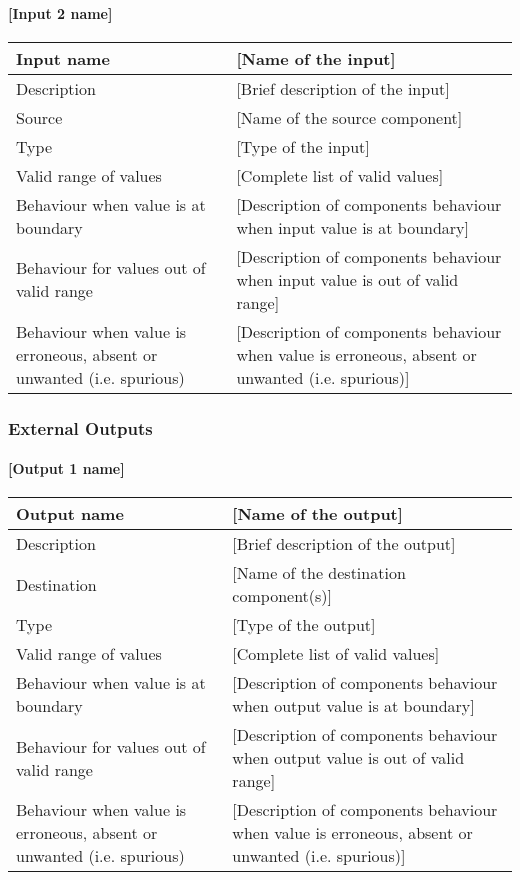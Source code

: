 \paragraph{[Input 2 name]}

\begin{longtable}{p{}p{}}
\toprule
Input name				& [Name of the input] \\
\midrule
Description				& [Brief description of the input] \\
\midrule
Source					& [Name of the source component] \\ 
\midrule
Type					& [Type of the input] \\
\midrule
Valid range of values	& [Complete list of valid values] \\
\midrule
Behaviour when value is at boundary	& [Description of components behaviour when input value is at boundary] \\
\midrule
Behaviour for values out of valid range	& [Description of components behaviour when input value is out of valid range] \\
\midrule
Behaviour when value is erroneous, absent or unwanted (i.e. spurious) & [Description of components behaviour when value is erroneous, absent or unwanted (i.e. spurious)] \\
\bottomrule
\end{longtable}


\subsubsection{External Outputs}

\paragraph{[Output 1 name]}

\begin{longtable}{p{}p{}}
\toprule
Output name				& [Name of the output] \\
\midrule
Description				& [Brief description of the output] \\
\midrule
Destination				& [Name of the destination component(s)] \\ 
\midrule
Type					& [Type of the output] \\
\midrule
Valid range of values	& [Complete list of valid values] \\
\midrule
Behaviour when value is at boundary	& [Description of components behaviour when output value is at boundary] \\
\midrule
Behaviour for values out of valid range	& [Description of components behaviour when output value is out of valid range] \\
\midrule
Behaviour when value is erroneous, absent or unwanted (i.e. spurious) & [Description of components behaviour when value is erroneous, absent or unwanted (i.e. spurious)] \\
\bottomrule
\end{longtable}


